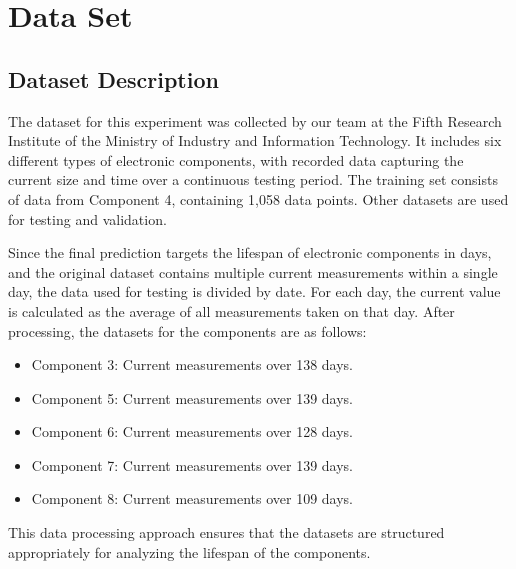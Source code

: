 \section{Data Set}
\label{sec:dataset}
\subsection{Dataset Description}

The dataset for this experiment was collected by our team at the Fifth Research Institute of the Ministry of Industry and Information Technology. It includes six different types of electronic components, with recorded data capturing the current size and time over a continuous testing period. The training set consists of data from Component 4, containing 1,058 data points. Other datasets are used for testing and validation.

Since the final prediction targets the lifespan of electronic components in days, and the original dataset contains multiple current measurements within a single day, the data used for testing is divided by date. For each day, the current value is calculated as the average of all measurements taken on that day. After processing, the datasets for the components are as follows:
\begin{itemize}
    \item Component 3: Current measurements over 138 days.
    \item Component 5: Current measurements over 139 days.
    \item Component 6: Current measurements over 128 days.
    \item Component 7: Current measurements over 139 days.
    \item Component 8: Current measurements over 109 days.
\end{itemize}

This data processing approach ensures that the datasets are structured appropriately for analyzing the lifespan of the components.


